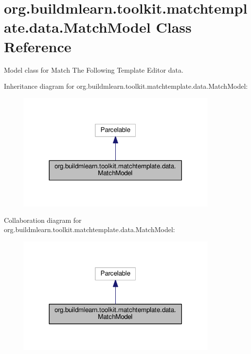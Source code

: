 \hypertarget{classorg_1_1buildmlearn_1_1toolkit_1_1matchtemplate_1_1data_1_1MatchModel}{}\section{org.\+buildmlearn.\+toolkit.\+matchtemplate.\+data.\+Match\+Model Class Reference}
\label{classorg_1_1buildmlearn_1_1toolkit_1_1matchtemplate_1_1data_1_1MatchModel}


Model class for Match The Following Template Editor data.  




Inheritance diagram for org.\+buildmlearn.\+toolkit.\+matchtemplate.\+data.\+Match\+Model\+:
\nopagebreak
\begin{figure}[H]
\begin{center}
\leavevmode
\includegraphics[width=284pt]{classorg_1_1buildmlearn_1_1toolkit_1_1matchtemplate_1_1data_1_1MatchModel__inherit__graph}
\end{center}
\end{figure}


Collaboration diagram for org.\+buildmlearn.\+toolkit.\+matchtemplate.\+data.\+Match\+Model\+:
\nopagebreak
\begin{figure}[H]
\begin{center}
\leavevmode
\includegraphics[width=284pt]{classorg_1_1buildmlearn_1_1toolkit_1_1matchtemplate_1_1data_1_1MatchModel__coll__graph}
\end{center}
\end{figure}
